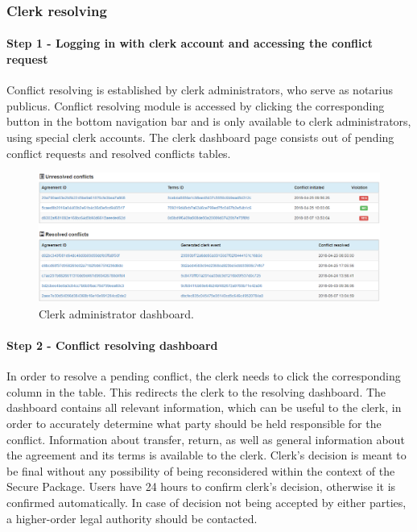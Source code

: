 \subsubsection{Clerk resolving}

\paragraph{Step 1 - Logging in with clerk account and accessing the conflict request}

Conflict resolving is established by clerk administrators, who serve as notarius publicus. Conflict resolving module is accessed by clicking the corresponding button in the bottom navigation bar and is only available to clerk administrators, using special clerk accounts. The clerk dashboard page consists out of pending conflict requests and resolved conflicts tables.

\begin{figure}[H]
\centering
\includegraphics[scale=0.445]{app_screens/clerk_dash.png}
\caption{Clerk administrator dashboard.}
\label{fig:clerkdash}
\end{figure}

\paragraph{Step 2 - Conflict resolving dashboard}
In order to resolve a pending conflict, the clerk needs to click the corresponding column in the table. This redirects the clerk to the resolving dashboard. The dashboard contains all relevant information, which can be useful to the clerk, in order to accurately determine what party should be held responsible for the conflict. Information about transfer, return, as well as general information about the agreement and its terms is available to the clerk. Clerk's decision is meant to be final without any possibility of being reconsidered within the context of the Secure Package. Users have 24 hours to confirm clerk's decision, otherwise it is confirmed automatically. In case of decision not being accepted by either parties, a higher-order legal authority should be contacted.

